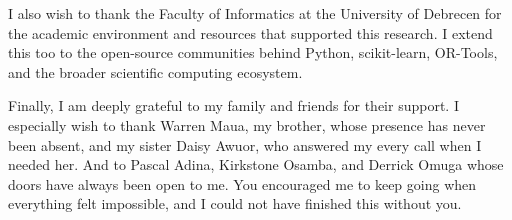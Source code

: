 \documentclass[12pt,a4paper,oneside]{article}
\begin{document}
I also wish to thank the Faculty of Informatics at the University of Debrecen for the academic environment and resources that supported this research. I extend this too to the open-source communities behind Python, scikit-learn, OR-Tools, and the broader scientific computing ecosystem.

Finally, I am deeply grateful to my family and friends for their support. I especially wish to thank Warren Maua, my brother, whose presence has never been absent, and my sister Daisy Awuor, who answered my every call when I needed her. And to Pascal Adina, Kirkstone Osamba, and Derrick Omuga whose doors have always been open to me. You encouraged me to keep going when everything felt impossible, and I could not have finished this without you.



\newpage
\end{document}
